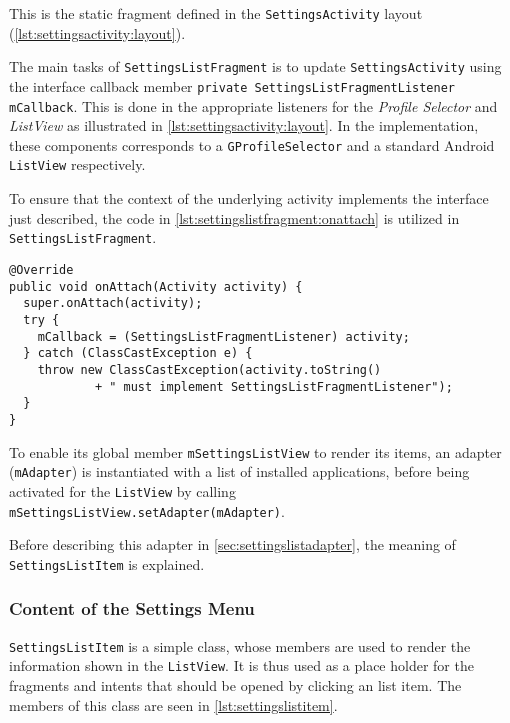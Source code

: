 This is the static fragment defined in the \lstinline|SettingsActivity| layout (\cref{lst:settingsactivity:layout}).

The main tasks of \lstinline|SettingsListFragment| is to update \lstinline|SettingsActivity| using the interface callback member \lstinline|private SettingsListFragmentListener mCallback|.
This is done in the appropriate listeners for the \textit{Profile Selector} and \textit{ListView} as illustrated in \cref{lst:settingsactivity:layout}.
In the implementation, these components corresponds to a \lstinline|GProfileSelector| and a standard Android \lstinline|ListView| respectively.

To ensure that the context of the underlying activity implements the interface just described, the code in \cref{lst:settingslistfragment:onattach} is utilized in \lstinline|SettingsListFragment|.

\begin{lstlisting}[caption={Implementation to make sure the underlying activity implements the \lstinline|SettingsListFragmentListener| interface.}, label={lst:settingslistfragment:onattach}]
@Override
public void onAttach(Activity activity) {
  super.onAttach(activity);
  try {
    mCallback = (SettingsListFragmentListener) activity;
  } catch (ClassCastException e) {
    throw new ClassCastException(activity.toString()
            + " must implement SettingsListFragmentListener");
  }
}
\end{lstlisting}

To enable its global member \lstinline|mSettingsListView| to render its items, an adapter (\lstinline|mAdapter|) is instantiated with a list of installed applications, before being activated for the \lstinline|ListView| by calling \lstinline|mSettingsListView.setAdapter(mAdapter)|.

Before describing this adapter in \cref{sec:settingslistadapter}, the meaning of \lstinline|SettingsListItem| is explained.


\subsubsection{Content of the Settings Menu}
\lstinline|SettingsListItem| is a simple class, whose members are used to render the information shown in the \lstinline|ListView|.
It is thus used as a place holder for the fragments and intents that should be opened by clicking an list item.
The members of this class are seen in \cref{lst:settingslistitem}.

